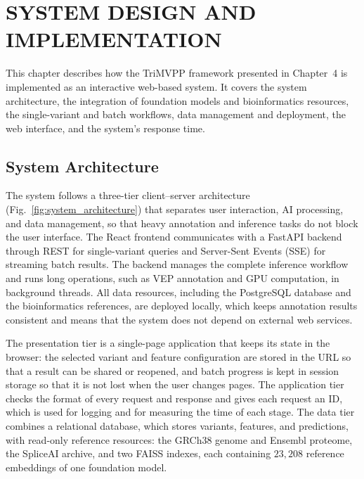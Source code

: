 \providecommand{\tbd}{\underline{\hspace{1.2cm}}}

\chapter{SYSTEM DESIGN AND IMPLEMENTATION}
\label{chap:system_design}

This chapter describes how the TriMVPP framework presented in Chapter~4 is implemented as an interactive web-based system. It covers the system architecture, the integration of foundation models and bioinformatics resources, the single-variant and batch workflows, data management and deployment, the web interface, and the system's response time.

\section{System Architecture}
\label{sec:system_architecture}

The system follows a three-tier client--server architecture (Fig.~\ref{fig:system_architecture}) that separates user interaction, AI processing, and data management, so that heavy annotation and inference tasks do not block the user interface. The React frontend communicates with a FastAPI backend through REST for single-variant queries and Server-Sent Events (SSE) for streaming batch results. The backend manages the complete inference workflow and runs long operations, such as VEP annotation and GPU computation, in background threads. All data resources, including the PostgreSQL database and the bioinformatics references, are deployed locally, which keeps annotation results consistent and means that the system does not depend on external web services.

The presentation tier is a single-page application that keeps its state in the browser: the selected variant and feature configuration are stored in the URL so that a result can be shared or reopened, and batch progress is kept in session storage so that it is not lost when the user changes pages. The application tier checks the format of every request and response and gives each request an ID, which is used for logging and for measuring the time of each stage. The data tier combines a relational database, which stores variants, features, and predictions, with read-only reference resources: the GRCh38 genome and Ensembl proteome, the SpliceAI archive, and two FAISS indexes, each containing $23{,}208$ reference embeddings of one foundation model.

